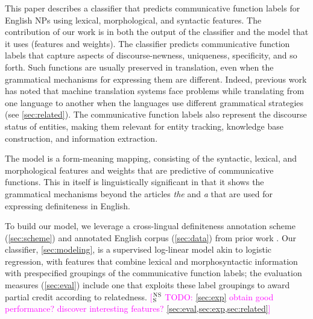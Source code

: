 \documentclass[11pt,letterpaper]{article}
\newcommand{\ensuretext}[1]{#1}
\newcommand{\nssmarker}{\ensuretext{\textcolor{magenta}{\ensuremath{^{\textsc{NS}}_{\textsc{S}}}}}}
\newcommand{\abmarker}{\ensuretext{\textcolor{red}{\ensuremath{^{\textsc{A}}_{\textsc{B}}}}}}
\newcommand{\arkcomment}[3]{\ensuretext{\textcolor{#3}{[#1 #2]}}}
\newcommand{\nss}[1]{\arkcomment{\nssmarker}{#1}{magenta}}
\newcommand{\ab}[1]{\arkcomment{\abmarker}{#1}{red}}
\begin{document}
This paper describes a classifier that predicts communicative function labels for English NPs  
using lexical, morphological, and syntactic features.   
The contribution of our work is in both the output of the classifier and the model that it uses (features and weights).  %
The classifier predicts communicative function labels that capture aspects of discourse-newness, uniqueness, specificity, and so forth. %
Such functions are usually preserved in translation, even when the grammatical mechanisms 
for expressing them are different. 
Indeed, previous work has noted that machine translation systems face problems 
while translating from one language to another when the languages use different grammatical strategies (see \cref{sec:related}).
The communicative function labels also represent the discourse status of entities, 
making them relevant for entity tracking, knowledge base construction, and information extraction. 

The model is a form-meaning mapping, consisting of the syntactic, lexical, and morphological features 
and weights that are predictive of communicative functions.   
This in itself is linguistically significant in that it shows the grammatical mechanisms 
beyond the articles {\em the} and {\em a} that are used for expressing definiteness in English.   

To build our model, we leverage a cross-lingual definiteness annotation scheme (\cref{sec:scheme}) 
and annotated English corpus (\cref{sec:data}) from prior work \citep{bhatia14}.
Our classifier, \cref{sec:modeling}, is a supervised log-linear model akin to logistic regression,
with features that combine lexical and morphosyntactic information 
with prespecified groupings of the communicative function labels;
the evaluation measures (\cref{sec:eval}) include one that exploits these label groupings 
to award partial credit according to relatedness.
\nss{TODO: \cref{sec:exp} obtain good performance? discover interesting features? \cref{sec:eval,sec:exp,sec:related}}
\end{document}
